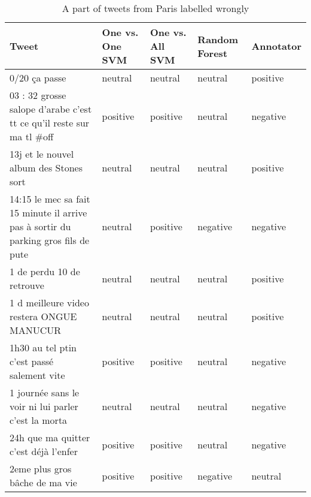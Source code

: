 \begin{table}[ht]
	\caption{A part of tweets from Paris labelled wrongly}
	\begin{tabular}{|p{5cm}|p{1.8cm}|p{1.8cm}|p{1.8cm}|p{1.8cm}|} \hline
	Tweet & One vs. One SVM &One vs. All SVM &Random Forest & Annotator\\ \hline

	0/20 \c ca passe & neutral & neutral & neutral & positive \\ \hline
	03 : 32 grosse salope d'arabe c'est tt ce qu'il reste sur ma tl \#off & positive & positive & neutral & negative \\ \hline
	13j et le nouvel album des Stones sort & neutral& neutral& neutral & positive \\ \hline
	14:15 le mec sa fait 15 minute il arrive pas \`a sortir du parking gros fils de pute &neutral & positive & negative & negative \\ \hline 
	1 de perdu 10 de retrouve & neutral& neutral& neutral & positive \\ \hline 

	1 d meilleure video restera ONGUE MANUCUR & neutral& neutral& neutral & positive \\ \hline
	1h30 au tel ptin c'est pass\'e salement vite & positive & positive & neutral & negative \\ \hline
	1 journ\'ee sans le voir ni lui parler c'est la morta& neutral& neutral& neutral & negative \\ \hline
	24h que ma quitter c'est d\'ej\`a l'enfer&positive&positive & neutral&negative\\ \hline
	2eme plus gros bâche de ma vie&positive &positive &negative&neutral \\ \hline

	\end{tabular}
	\label{tab:wrong_tweets_fr}
\end{table}

\clearpage
